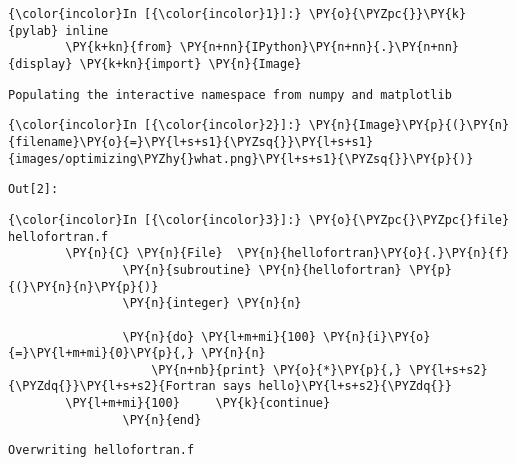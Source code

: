     




    \begin{Verbatim}[commandchars=\\\{\}]
{\color{incolor}In [{\color{incolor}1}]:} \PY{o}{\PYZpc{}}\PY{k}{pylab} inline
        \PY{k+kn}{from} \PY{n+nn}{IPython}\PY{n+nn}{.}\PY{n+nn}{display} \PY{k+kn}{import} \PY{n}{Image}
\end{Verbatim}

    \begin{Verbatim}[commandchars=\\\{\}]
Populating the interactive namespace from numpy and matplotlib

    \end{Verbatim}



    \begin{Verbatim}[commandchars=\\\{\}]
{\color{incolor}In [{\color{incolor}2}]:} \PY{n}{Image}\PY{p}{(}\PY{n}{filename}\PY{o}{=}\PY{l+s+s1}{\PYZsq{}}\PY{l+s+s1}{images/optimizing\PYZhy{}what.png}\PY{l+s+s1}{\PYZsq{}}\PY{p}{)}
\end{Verbatim}
\texttt{\color{outcolor}Out[{\color{outcolor}2}]:}








    \begin{Verbatim}[commandchars=\\\{\}]
{\color{incolor}In [{\color{incolor}3}]:} \PY{o}{\PYZpc{}\PYZpc{}file} hellofortran.f
        \PY{n}{C} \PY{n}{File}  \PY{n}{hellofortran}\PY{o}{.}\PY{n}{f}
                \PY{n}{subroutine} \PY{n}{hellofortran} \PY{p}{(}\PY{n}{n}\PY{p}{)}
                \PY{n}{integer} \PY{n}{n}
               
                \PY{n}{do} \PY{l+m+mi}{100} \PY{n}{i}\PY{o}{=}\PY{l+m+mi}{0}\PY{p}{,} \PY{n}{n}
                    \PY{n+nb}{print} \PY{o}{*}\PY{p}{,} \PY{l+s+s2}{\PYZdq{}}\PY{l+s+s2}{Fortran says hello}\PY{l+s+s2}{\PYZdq{}}
        \PY{l+m+mi}{100}     \PY{k}{continue}
                \PY{n}{end}
\end{Verbatim}

    \begin{Verbatim}[commandchars=\\\{\}]
Overwriting hellofortran.f

    \end{Verbatim}




